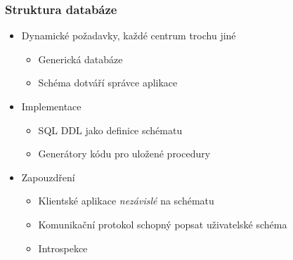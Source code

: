 \documentclass{beamer}
\begin{document}
\begin{frame}[fragile]
\frametitle{Struktura databáze}
\begin{itemize}
    \item Dynamické požadavky, každé centrum trochu jiné
        \begin{itemize}
            \item Generická databáze
            \item Schéma dotváří správce aplikace
        \end{itemize}
    \item Implementace
        \begin{itemize}
            \item SQL DDL jako definice schématu
            \item Generátory kódu pro uložené procedury
        \end{itemize}
    \item Zapouzdření
        \begin{itemize}
            \item Klientské aplikace {\em nezávislé} na schématu
            \item Komunikační protokol schopný popsat uživatelské schéma
            \item Introspekce
        \end{itemize}
\end{itemize}
\end{frame}
\end{document}
